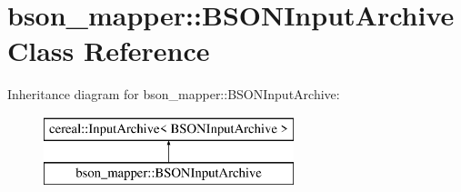 \hypertarget{classbson__mapper_1_1BSONInputArchive}{}\section{bson\+\_\+mapper\+:\+:B\+S\+O\+N\+Input\+Archive Class Reference}
\label{classbson__mapper_1_1BSONInputArchive}
Inheritance diagram for bson\+\_\+mapper\+:\+:B\+S\+O\+N\+Input\+Archive\+:\begin{figure}[H]
\begin{center}
\leavevmode
\includegraphics[height=2.000000cm]{classbson__mapper_1_1BSONInputArchive}
\end{center}
\end{figure}

